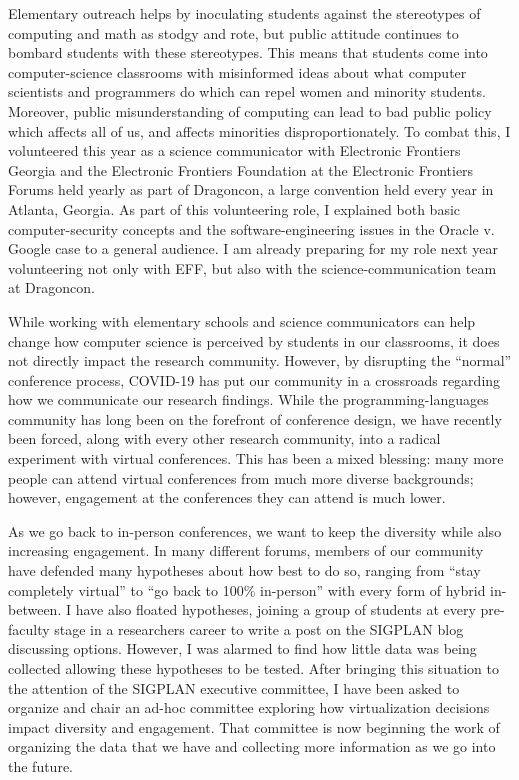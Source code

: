 \documentclass{article}
\theoremstyle{definition}
\begin{document}
Elementary outreach helps by inoculating students against the stereotypes of computing and math as stodgy and rote, but public attitude continues to bombard students with these stereotypes.
This means that students come into computer-science classrooms with misinformed ideas about what computer scientists and programmers do which can repel women and minority students.
Moreover, public misunderstanding of computing can lead to bad public policy which affects all of us, and affects minorities disproportionately.
To combat this, I volunteered this year as a science communicator with Electronic Frontiers Georgia and the Electronic Frontiers Foundation at the Electronic Frontiers Forums held yearly as part of Dragoncon, a large convention held every year in Atlanta, Georgia.
As part of this volunteering role, I explained both basic computer-security concepts and the software-engineering issues in the Oracle v. Google case to a general audience.
I am already preparing for my role next year volunteering not only with EFF, but also with the science-communication team at Dragoncon.

While working with elementary schools and science communicators can help change how computer science is perceived by students in our classrooms, it does not directly impact the research community.
However, by disrupting the ``normal'' conference process, COVID-19 has put our community in a crossroads regarding how we communicate our research findings.
While the programming-languages community has long been on the forefront of conference design, we have recently been forced, along with every other research community, into a radical experiment with virtual conferences.
This has been a mixed blessing: many more people can attend virtual conferences from much more diverse backgrounds; however, engagement at the conferences they can attend is much lower.

As we go back to in-person conferences, we want to keep the diversity while also increasing engagement.
In many different forums, members of our community have defended many hypotheses about how best to do so, ranging from ``stay completely virtual'' to ``go back to 100\% in-person'' with every form of hybrid in-between.
I have also floated hypotheses, joining a group of students at every pre-faculty stage in a researchers career to write a post on the SIGPLAN blog discussing options.
However, I was alarmed to find how little data was being collected allowing these hypotheses to be tested.
After bringing this situation to the attention of the SIGPLAN executive committee, I have been asked to organize and chair an ad-hoc committee exploring how virtualization decisions impact diversity and engagement.
That committee is now beginning the work of organizing the data that we have and collecting more information as we go into the future.
\end{document}
